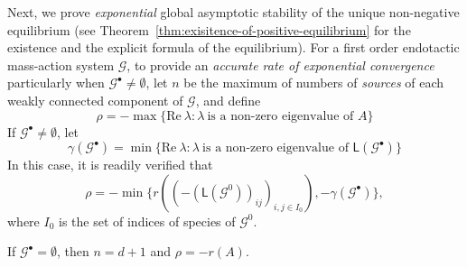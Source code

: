 \documentclass[10pt]{amsart}
\numberwithin{equation}{section}
\theoremstyle{plain}
\theoremstyle{definition}
\theoremstyle{remark}
\newcommand{\cG}{\mathcal{G}}
\newcommand{\cI}{I}
\begin{document}
Next, we prove \emph{exponential} global asymptotic stability of the unique non-negative equilibrium (see Theorem~\ref{thm:exisitence-of-positive-equilibrium} for the existence and the explicit formula of the equilibrium). For a first order endotactic mass-action system $\cG$, to provide an \emph{accurate rate of exponential convergence} particularly when $\cG^{\bullet}\neq\emptyset$, let $n$ be the maximum of numbers of \emph{sources} of each weakly connected component of $\cG$, and define
\[\rho=-\max\{\text{Re}\ \lambda\colon \lambda\ \text{is a non-zero eigenvalue of } A\}\]
If $\cG^{\bullet}\neq\emptyset$, let
$$\gamma(\cG^{\bullet})=\min\{\text{Re}\ \lambda\colon \lambda\ \text{is a non-zero eigenvalue of } \mathsf{L}(\cG^{\bullet})\}$$
In this case, it is readily verified that $$\rho=-\min\{r((-(\mathsf{L}(\cG^0))_{ij})_{i,j\in\cI_0}),-\gamma(\cG^{\bullet})\},$$
where $\cI_0$ is the set of indices of species of $\cG^0$.

If $\cG^{\bullet}=\emptyset$, then $n=d+1$ and $\rho=-r(A)$.
\end{document}
